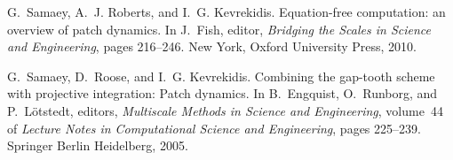 \documentclass[12pt,a4paper]{article}
\begin{document}
\begin{thebibliography}{10}
G.~Samaey, A.~J. Roberts, and I.~G. Kevrekidis.
\newblock Equation-free computation: an overview of patch dynamics.
\newblock In J.~Fish, editor, {\em Bridging the Scales in Science and
  Engineering}, pages 216--246. New York, Oxford University Press, 2010.

G.~Samaey, D.~Roose, and I.~G. Kevrekidis.
\newblock Combining the gap-tooth scheme with projective integration: Patch
  dynamics.
\newblock In B.~Engquist, O.~Runborg, and P.~L\" otstedt, editors, {\em
  Multiscale Methods in Science and Engineering}, volume~44 of {\em Lecture
  Notes in Computational Science and Engineering}, pages 225--239. Springer
  Berlin Heidelberg, 2005.
\newblock {}

\end{thebibliography}
\end{document}
